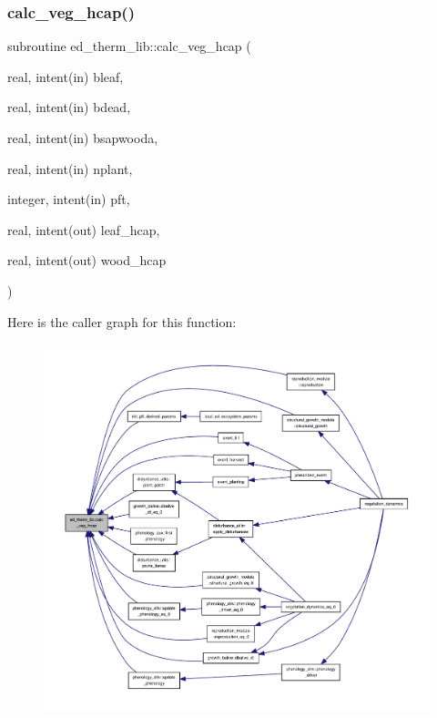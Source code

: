 \subsubsection{\texorpdfstring{calc\+\_\+veg\+\_\+hcap()}{calc\_veg\_hcap()}}
{\footnotesize\ttfamily subroutine ed\+\_\+therm\+\_\+lib\+::calc\+\_\+veg\+\_\+hcap (\begin{DoxyParamCaption}\item[{real, intent(in)}]{bleaf,  }\item[{real, intent(in)}]{bdead,  }\item[{real, intent(in)}]{bsapwooda,  }\item[{real, intent(in)}]{nplant,  }\item[{integer, intent(in)}]{pft,  }\item[{real, intent(out)}]{leaf\+\_\+hcap,  }\item[{real, intent(out)}]{wood\+\_\+hcap }\end{DoxyParamCaption})}

Here is the caller graph for this function\+:
\nopagebreak
\begin{figure}[H]
\begin{center}
\leavevmode
\includegraphics[width=350pt]{namespaceed__therm__lib_a882f2cd5f4a75f8c01d2167f45afebb7_icgraph}
\end{center}
\end{figure}
\mbox{\label{namespaceed__therm__lib_aa6561183a4fc06ca1c9430914a5b6032}} 

